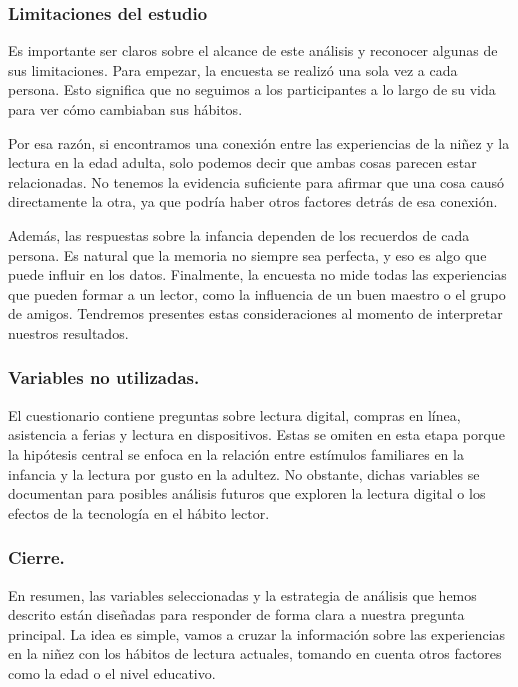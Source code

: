 \documentclass[aps,reprint]{revtex4-2}
\begin{document}
\vspace{0.5cm}

\subsubsection{Limitaciones del estudio}
Es importante ser claros sobre el alcance de este análisis y reconocer algunas de sus limitaciones. Para empezar, la encuesta se realizó una sola vez a cada persona. Esto significa que no seguimos a los participantes a lo largo de su vida para ver cómo cambiaban sus hábitos.

Por esa razón, si encontramos una conexión entre las experiencias de la niñez y la lectura en la edad adulta, solo podemos decir que ambas cosas parecen estar relacionadas. No tenemos la evidencia suficiente para afirmar que una cosa causó directamente la otra, ya que podría haber otros factores detrás de esa conexión.

Además, las respuestas sobre la infancia dependen de los recuerdos de cada persona. Es natural que la memoria no siempre sea perfecta, y eso es algo que puede influir en los datos. Finalmente, la encuesta no mide todas las experiencias que pueden formar a un lector, como la influencia de un buen maestro o el grupo de amigos. Tendremos presentes estas consideraciones al momento de interpretar nuestros resultados.
\vspace{0.5cm}

\subsubsection{Variables no utilizadas.}
El cuestionario contiene preguntas sobre lectura digital, compras en línea, asistencia a ferias y lectura en dispositivos. Estas se omiten en esta etapa porque la hipótesis central se enfoca en la relación entre estímulos familiares en la infancia y la lectura por gusto en la adultez. No obstante, dichas variables se documentan para posibles análisis futuros que exploren la lectura digital o los efectos de la tecnología en el hábito lector.

\vspace{0.5cm}

\subsubsection{Cierre.}
En resumen, las variables seleccionadas y la estrategia de análisis que hemos descrito están diseñadas para responder de forma clara a nuestra pregunta principal. La idea es simple, vamos a cruzar la información sobre las experiencias en la niñez con los hábitos de lectura actuales, tomando en cuenta otros factores como la edad o el nivel educativo.
\end{document}
